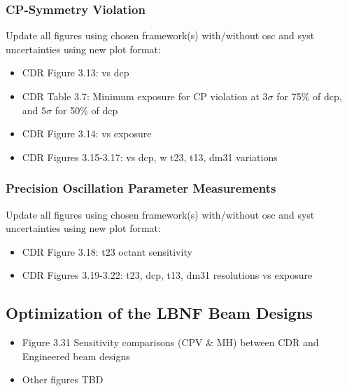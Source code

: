 \subsubsection{CP-Symmetry Violation}
Update all figures using chosen framework(s) with/without osc and syst uncertainties using new plot format:
\begin{itemize}
	\item CDR Figure 3.13: vs dcp
	\item CDR Table 3.7: Minimum exposure for CP violation at $3\sigma$ for 75\% of dcp, and $5\sigma$ for 50\% of dcp
	\item CDR Figure 3.14: vs exposure
	\item CDR Figures 3.15-3.17: vs dcp, w t23, t13, dm31 variations
\end{itemize}

\subsubsection{Precision Oscillation Parameter Measurements}
Update all figures using chosen framework(s) with/without osc and syst uncertainties using new plot format:
\begin{itemize}
	\item CDR Figure 3.18: t23 octant sensitivity
	\item CDR Figures 3.19-3.22: t23, dcp, t13, dm31 resolutions vs exposure
\end{itemize}

\subsection{Optimization of the LBNF Beam Designs}
\begin{itemize}
\item Figure 3.31 Sensitivity comparisons (CPV \& MH) between CDR and Engineered beam designs
\item Other figures TBD
\end{itemize}
\label{sec:osc-bm-nus}
